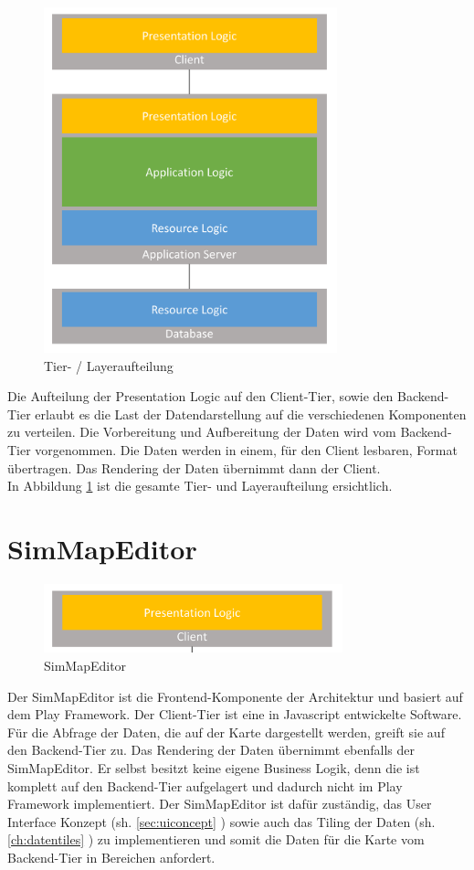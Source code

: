 \begin{figure}[H]
\centering
\includegraphics[height=10cm]{images/layers.png}
\caption{Tier- / Layeraufteilung}
\label{fig:tierlayers}
\end{figure}
\noindent
Die Aufteilung der Presentation Logic auf den Client-Tier, sowie den Backend-Tier erlaubt es die Last der Datendarstellung auf die verschiedenen Komponenten zu verteilen. Die Vorbereitung und Aufbereitung der Daten wird vom Backend-Tier vorgenommen. Die Daten werden in einem, für den Client lesbaren, Format übertragen. Das Rendering der Daten übernimmt dann der Client.\\
In Abbildung \ref{fig:tierlayers} ist die gesamte Tier- und Layeraufteilung ersichtlich.
\section{SimMapEditor}
\begin{figure}[H]
\centering
\includegraphics[height=2cm]{images/presentationlayer.png}
\caption{SimMapEditor}
\label{fig:presentationlayer}
\end{figure}
\noindent
Der SimMapEditor ist die Frontend-Komponente der Architektur und basiert auf dem Play Framework. Der Client-Tier ist eine in Javascript entwickelte Software. Für die Abfrage der Daten, die auf der Karte dargestellt werden, greift sie auf den Backend-Tier zu. Das Rendering der Daten übernimmt ebenfalls der SimMapEditor. Er selbst besitzt keine eigene Business Logik, denn die ist komplett auf den Backend-Tier aufgelagert und dadurch nicht im Play Framework implementiert. Der SimMapEditor ist dafür zuständig, das User Interface Konzept (sh. \ref{sec:uiconcept} ) sowie auch das Tiling der Daten (sh. \ref{ch:datentiles} ) zu implementieren und somit die Daten für die Karte vom Backend-Tier in Bereichen anfordert.
